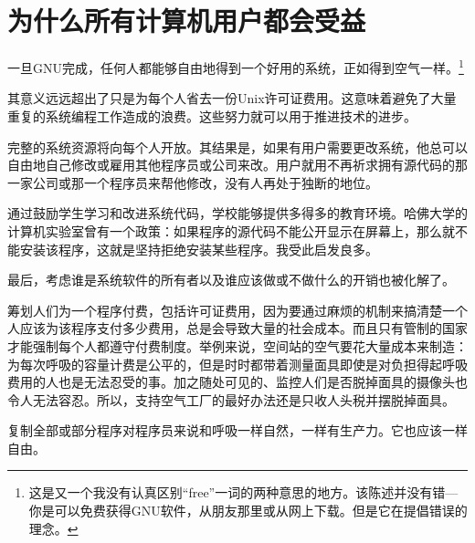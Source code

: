 \documentclass{book}
\begin{document}
\section{为什么所有计算机用户都会受益}
一旦GNU完成，任何人都能够自由地得到一个好用的系统，正如得到空气一样。\footnote{这是又一个我没有认真区别“free”一词的两种意思的地方。该陈述并没有错—你是可以免费获得GNU软件，从朋友那里或从网上下载。但是它在提倡错误的理念。}\par
其意义远远超出了只是为每个人省去一份Unix许可证费用。这意味着避免了大量重复的系统编程工作造成的浪费。这些努力就可以用于推进技术的进步。\par
完整的系统资源将向每个人开放。其结果是，如果有用户需要更改系统，他总可以自由地自己修改或雇用其他程序员或公司来改。用户就用不再祈求拥有源代码的那一家公司或那一个程序员来帮他修改，没有人再处于独断的地位。\par
通过鼓励学生学习和改进系统代码，学校能够提供多得多的教育环境。哈佛大学的计算机实验室曾有一个政策：如果程序的源代码不能公开显示在屏幕上，那么就不能安装该程序，这就是坚持拒绝安装某些程序。我受此启发良多。\par
最后，考虑谁是系统软件的所有者以及谁应该做或不做什么的开销也被化解了。\par
筹划人们为一个程序付费，包括许可证费用，因为要通过麻烦的机制来搞清楚一个人应该为该程序支付多少费用，总是会导致大量的社会成本。而且只有管制的国家才能强制每个人都遵守付费制度。举例来说，空间站的空气要花大量成本来制造：为每次呼吸的容量计费是公平的，但是时时都带着测量面具即使是对负担得起呼吸费用的人也是无法忍受的事。加之随处可见的、监控人们是否脱掉面具的摄像头也令人无法容忍。所以，支持空气工厂的最好办法还是只收人头税并摆脱掉面具。\par
复制全部或部分程序对程序员来说和呼吸一样自然，一样有生产力。它也应该一样自由。\par
\end{document}
